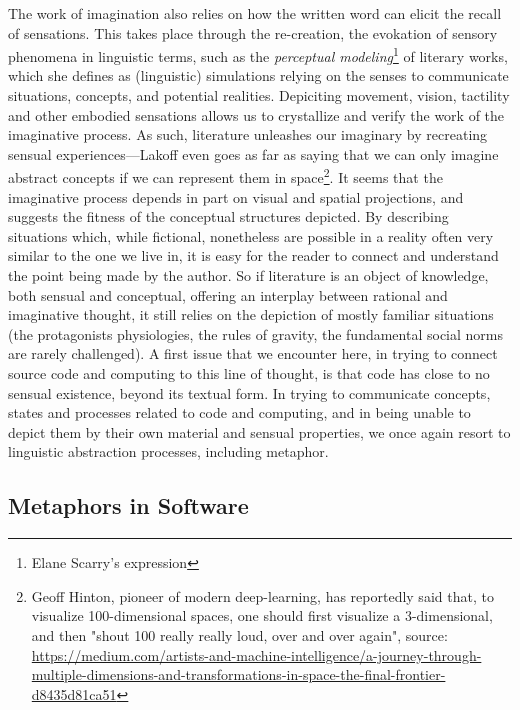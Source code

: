 \documentclass{article}
\begin{document}
The work of imagination also relies on how the written word can elicit the recall of sensations. This takes place through the re-creation, the evokation of sensory phenomena in linguistic terms, such as the \emph{perceptual modeling}\footnote{Elane Scarry's expression} of literary works, which she defines as (linguistic) simulations relying on the senses to communicate situations, concepts, and potential realities. Depiciting movement, vision, tactility and other embodied sensations allows us to crystallize and verify the work of the imaginative process. As such, literature unleashes our imaginary by recreating sensual experiences—Lakoff even goes as far as saying that we can only imagine abstract concepts if we can represent them in space\footnote{Geoff Hinton, pioneer of modern deep-learning, has reportedly said that, to visualize 100-dimensional spaces, one should first visualize a 3-dimensional, and then "shout 100 really really loud, over and over again", source: \url{https://medium.com/artists-and-machine-intelligence/a-journey-through-multiple-dimensions-and-transformations-in-space-the-final-frontier-d8435d81ca51}}. It seems that the imaginative process depends in part on visual and spatial projections, and suggests the fitness of the conceptual structures depicted. By describing situations which, while fictional, nonetheless are possible in a reality often very similar to the one we live in, it is easy for the reader to connect and understand the point being made by the author. So if literature is an object of knowledge, both sensual and conceptual, offering an interplay between rational and imaginative thought, it still relies on the depiction of mostly familiar situations (the protagonists physiologies, the rules of gravity, the fundamental social norms are rarely challenged). A first issue that we encounter here, in trying to connect source code and computing to this line of thought, is that code has close to no sensual existence, beyond its textual form. In trying to communicate concepts, states and processes related to code and computing, and in being unable to depict them by their own material and sensual properties, we once again resort to linguistic abstraction processes, including metaphor.

\vspace{1\baselineskip}

\subsection{Metaphors in Software}
\end{document}
